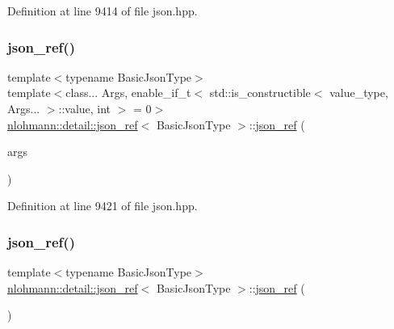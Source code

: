 Definition at line 9414 of file json.\+hpp.

\mbox{\label{classnlohmann_1_1detail_1_1json__ref_a8a31d6c588d6c3c06b62008fd5d36c6c}} 
\subsubsection{\texorpdfstring{json\_ref()}{json\_ref()}\hspace{0.1cm}{\footnotesize\ttfamily [4/6]}}
{\footnotesize\ttfamily template$<$typename Basic\+Json\+Type$>$ \\
template$<$class... Args, enable\+\_\+if\+\_\+t$<$ std\+::is\+\_\+constructible$<$ value\+\_\+type, Args... $>$\+::value, int $>$  = 0$>$ \\
\mbox{\hyperlink{classnlohmann_1_1detail_1_1json__ref}{nlohmann\+::detail\+::json\+\_\+ref}}$<$ Basic\+Json\+Type $>$\+::\mbox{\hyperlink{classnlohmann_1_1detail_1_1json__ref}{json\+\_\+ref}} (\begin{DoxyParamCaption}\item[{Args \&\&...}]{args }\end{DoxyParamCaption})\hspace{0.3cm}{\ttfamily [inline]}}



Definition at line 9421 of file json.\+hpp.

\mbox{\label{classnlohmann_1_1detail_1_1json__ref_a59221ddbd756ca24d289c787fab38dbc}} 
\subsubsection{\texorpdfstring{json\_ref()}{json\_ref()}\hspace{0.1cm}{\footnotesize\ttfamily [5/6]}}
{\footnotesize\ttfamily template$<$typename Basic\+Json\+Type$>$ \\
\mbox{\hyperlink{classnlohmann_1_1detail_1_1json__ref}{nlohmann\+::detail\+::json\+\_\+ref}}$<$ Basic\+Json\+Type $>$\+::\mbox{\hyperlink{classnlohmann_1_1detail_1_1json__ref}{json\+\_\+ref}} (\begin{DoxyParamCaption}\item[{\mbox{\hyperlink{classnlohmann_1_1detail_1_1json__ref}{json\+\_\+ref}}$<$ Basic\+Json\+Type $>$ \&\&}]{ }\end{DoxyParamCaption})\hspace{0.3cm}{\ttfamily [default]}}

